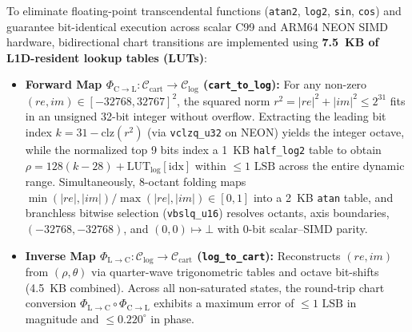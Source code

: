 \documentclass[11pt, a4paper]{article}
\begin{document}
To eliminate floating-point transcendental functions (\texttt{atan2}, \texttt{log2}, \texttt{sin}, \texttt{cos}) and guarantee bit-identical execution across scalar C99 and ARM64 NEON SIMD hardware, bidirectional chart transitions are implemented using \textbf{7.5~KB of L1D-resident lookup tables (LUTs)}:
\begin{itemize}
    \item \textbf{Forward Map $\Phi_{\mathrm{C}\to\mathrm{L}}: \mathcal{C}_{\mathrm{cart}} \to \mathcal{C}_{\mathrm{log}}$ (\texttt{cart\_to\_log}):} For any non-zero $(re, im) \in [-32768, 32767]^2$, the squared norm $r^2 = |re|^2 + |im|^2 \le 2^{31}$ fits in an unsigned 32-bit integer without overflow. Extracting the leading bit index $k = 31 - \mathrm{clz}(r^2)$ (via \texttt{vclzq\_u32} on NEON) yields the integer octave, while the normalized top 9 bits index a 1~KB \texttt{half\_log2} table to obtain $\rho = 128(k - 28) + \mathrm{LUT}_{\log}[\mathrm{idx}]$ within $\le 1\text{ LSB}$ across the entire dynamic range. Simultaneously, 8-octant folding maps $\min(|re|,|im|)/\max(|re|,|im|) \in [0, 1]$ into a 2~KB \texttt{atan} table, and branchless bitwise selection (\texttt{vbslq\_u16}) resolves octants, axis boundaries, $(-32768, -32768)$, and $(0,0) \mapsto \bot$ with 0-bit scalar--SIMD parity.
    \item \textbf{Inverse Map $\Phi_{\mathrm{L}\to\mathrm{C}}: \mathcal{C}_{\mathrm{log}} \to \mathcal{C}_{\mathrm{cart}}$ (\texttt{log\_to\_cart}):} Reconstructs $(re, im)$ from $(\rho, \theta)$ via quarter-wave trigonometric tables and octave bit-shifts (4.5~KB combined). Across all non-saturated states, the round-trip chart conversion $\Phi_{\mathrm{L}\to\mathrm{C}} \circ \Phi_{\mathrm{C}\to\mathrm{L}}$ exhibits a maximum error of $\le 1\text{ LSB}$ in magnitude and $\le 0.220^\circ$ in phase.
\end{itemize}
\end{document}
